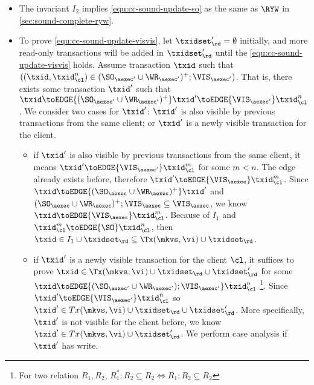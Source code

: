 \begin{itemize}
\item The invariant \( I_2 \) implies \cref{equ:cc-sound-update-so} as the same as \( \RYW \) in \cref{sec:sound-complete-ryw}.
\item To prove \cref{equ:cc-sound-update-visvis}, let \( \txidset'_\rd = \emptyset \) initially,
and more read-only transactions will be added in \( \txidset'_\rd \) until the \cref{equ:cc-sound-update-visvis} holds.
Assume transaction \( \txid \) such that \( ((\txid, \txid_\cl^n) \in ( \SO_{\aexec'} \cup \WR_{\aexec'} )^{+} ; \VIS_{\aexec'}) \).
That is, there exists some transaction \( \txid' \) such that
\( \txid \toEDGE{( \SO_{\aexec'} \cup \WR_{\aexec'} )^+}  \txid' \toEDGE{\VIS_{\aexec'}} \txid_\cl^n\).
We consider two cases for \( \txid' \): \( \txid' \) is also visible by previous transactions from the same client; 
or \( \txid' \) is a newly visible transaction for the client.
\begin{itemize}
    \item if \( \txid' \) is also visible by previous transactions from the same client, it means \( \txid' \toEDGE{\VIS_{\aexec'}} \txid_\cl^m \) for some \( m < n \).
    The edge already exists before, therefore \( \txid' \toEDGE{\VIS_\aexec} \txid_\cl^m \).
    Since \( \txid \toEDGE{( \SO_{\aexec} \cup \WR_{\aexec} )^{+}} \txid' \) and \( ( \SO_{\aexec} \cup \WR_{\aexec} )^{+} ; \VIS_{\aexec} \subseteq \VIS_{\aexec} \),
    we know \( \txid \toEDGE{ \VIS_{\aexec} }  \txid_\cl^m  \).
    Because of \( I_1 \) and \( \txid_\cl^m \toEDGE{\SO} \txid_\cl^n \), then \( \txid \in I_1 \cup \txidset_\rd \subseteq \Tx(\mkvs, \vi) \cup \txidset_\rd \).
    
    \item if \( \txid' \) is a newly visible transaction for the client \( \cl \),
    it suffices to prove \(\txid \in \Tx(\mkvs, \vi) \cup \txidset_\rd \cup \txidset'_\rd \) 
    for some \( \txid \toEDGE{ ( \SO_{\aexec'} \cup \WR_{\aexec'} ) ; \VIS_{\aexec'} } \txid_\cl^n  \)%
    \footnote{For two relation \( R_1, R_2\), \( R_1^* ; R_2 \subseteq R_2 \iff R_1 ; R_2 \subseteq R_2 \) }.
    Since \( \txid' \toEDGE{\VIS_{\aexec'}} \txid_\cl^n \) so \( \txid' \in Tx(\mkvs, \vi) \cup \txidset_\rd \cup \txidset'_\rd\).
    More specifically, \( \txid' \) is not visible for the client before, we know \( \txid' \in Tx(\mkvs, \vi) \cup \txidset'_\rd\).
    We perform case analysis if \( \txid' \) has write.
    \begin{itemize}


\end{itemize}
\end{itemize}
\end{itemize}
